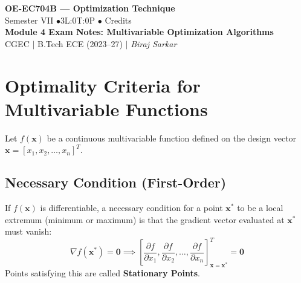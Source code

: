\documentclass[12pt,a4paper]{article}
\begin{document}

\begin{center}
  {\LARGE\bfseries\color{myred} OE-EC704B --- Optimization Technique}\\[5pt]
  {\normalsize\color{mydark} Semester VII \quad$\bullet$\quad 3L:0T:0P \quad$\bullet$ Credits}\\[3pt]
  {\normalsize\color{myteal}\textbf{Module 4 Exam Notes: Multivariable Optimization Algorithms}}\\[3pt]
  {\small\color{mydark} CGEC \;$|$\; B.Tech ECE (2023--27) \;$|$\; \textit{Biraj Sarkar}}
\end{center}
\vspace{2pt}
\noindent{\color{myred}\rule{\linewidth}{1.5pt}}
\vspace{2pt}

\hypersetup{linkcolor=mydark}
\tableofcontents
\hypersetup{linkcolor=myteal}
\newpage

\section{Optimality Criteria for Multivariable Functions}

Let $f(\mathbf{x})$ be a continuous multivariable function defined on the design vector $\mathbf{x} = [x_1, x_2, \dots, x_n]^T$.

\subsection{Necessary Condition (First-Order)}
\begin{tcolorbox}[defbox, title={Theorem: Multivariable Necessary Condition}]
If $f(\mathbf{x})$ is differentiable, a necessary condition for a point $\mathbf{x}^*$ to be a local extremum (minimum or maximum) is that the gradient vector evaluated at $\mathbf{x}^*$ must vanish:
\begin{equation}
  \nabla f(\mathbf{x}^*) = \mathbf{0} \implies \left[ \frac{\partial f}{\partial x_1}, \frac{\partial f}{\partial x_2}, \dots, \frac{\partial f}{\partial x_n} \right]^T_{\mathbf{x} = \mathbf{x}^*} = \mathbf{0}
\end{equation}
Points satisfying this are called \textbf{Stationary Points}.
\end{tcolorbox}
\end{document}
